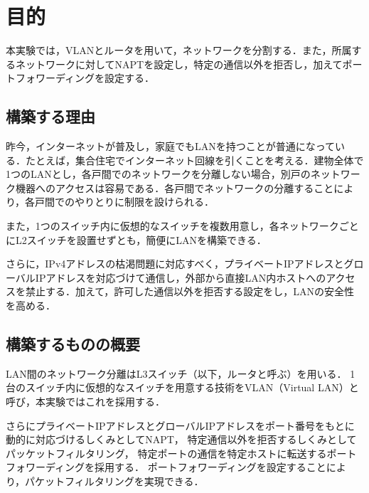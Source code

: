 \section{目的}
本実験では，VLANとルータを用いて，ネットワークを分割する．また，所属するネットワークに対してNAPTを設定し，特定の通信以外を拒否し，加えてポートフォワーディングを設定する．
\subsection{構築する理由}
昨今，インターネットが普及し，家庭でもLANを持つことが普通になっている．たとえば，集合住宅でインターネット回線を引くことを考える．建物全体で1つのLANとし，各戸間でのネットワークを分離しない場合，別戸のネットワーク機器へのアクセスは容易である．各戸間でネットワークの分離することにより，各戸間でのやりとりに制限を設けられる．\par
また，1つのスイッチ内に仮想的なスイッチを複数用意し，各ネットワークごとにL2スイッチを設置せずとも，簡便にLANを構築できる．\par
さらに，IPv4アドレスの枯渇問題に対応すべく，プライベートIPアドレスとグローバルIPアドレスを対応づけて通信し，外部から直接LAN内ホストへのアクセスを禁止する．加えて，許可した通信以外を拒否する設定をし，LANの安全性を高める．
\subsection{構築するものの概要}
LAN間のネットワーク分離はL3スイッチ（以下，ルータと呼ぶ）を用いる．
1台のスイッチ内に仮想的なスイッチを用意する技術をVLAN（Virtual LAN）と呼び，本実験ではこれを採用する．\par
さらにプライベートIPアドレスとグローバルIPアドレスをポート番号をもとに動的に対応づけるしくみとしてNAPT，
特定通信以外を拒否するしくみとしてパッケットフィルタリング，
特定ポートの通信を特定ホストに転送するポートフォワーディングを採用する．
ポートフォワーディングを設定することにより，パケットフィルタリングを実現できる．